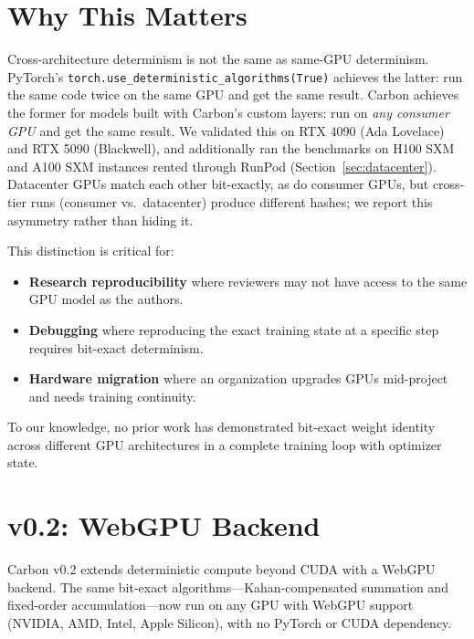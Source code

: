 \documentclass[11pt,a4paper]{article}
\begin{document}
\section{Why This Matters}

Cross-architecture determinism is not the same as same-GPU determinism.
PyTorch's \texttt{torch.use\_deterministic\_algorithms(True)} achieves the
latter: run the same code twice on the same GPU and get the same result.
Carbon achieves the former for models built with Carbon's custom layers: run
on \emph{any consumer GPU} and get the same result. We validated this on
RTX 4090 (Ada Lovelace) and RTX 5090 (Blackwell), and additionally ran the
benchmarks on H100 SXM and A100 SXM instances rented through RunPod
(Section~\ref{sec:datacenter}). Datacenter GPUs match each other bit-exactly,
as do consumer GPUs, but cross-tier runs (consumer vs.\ datacenter) produce
different hashes; we report this asymmetry rather than hiding it.

This distinction is critical for:

\begin{itemize}
  \item \textbf{Research reproducibility} where reviewers may not have access
    to the same GPU model as the authors.
  \item \textbf{Debugging} where reproducing the exact training state at a
    specific step requires bit-exact determinism.
  \item \textbf{Hardware migration} where an organization upgrades GPUs
    mid-project and needs training continuity.
\end{itemize}

To our knowledge, no prior work has demonstrated bit-exact weight identity
across different GPU architectures in a complete training loop with optimizer
state.

\section{v0.2: WebGPU Backend}

Carbon v0.2 extends deterministic compute beyond CUDA with a WebGPU backend.
The same bit-exact algorithms---Kahan-compensated summation and fixed-order
accumulation---now run on any GPU with WebGPU support (NVIDIA, AMD, Intel,
Apple Silicon), with no PyTorch or CUDA dependency.
\end{document}
